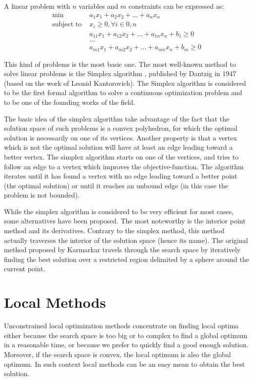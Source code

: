 A linear problem with $n$ variables and $m$ constraints can be expressed as:
\begin{align*}
\text{min } & a_1x_1 + a_2x_2 + ... + a_nx_n\\
\text{subject to } &x_i \geq 0, \forall i \in 0,n\\
&a_{11}x_1 + a_{12}x_2 + ... + a_{1n}x_n + b_1 \geq 0\\
&...\\
&a_{m1}x_1 + a_{m2}x_2 + ... + a_{mn}x_n + b_m \geq 0
\end{align*}

This kind of problems is the most basic one. The most well-known method to solve linear problems is the Simplex algorithm \cite{dantzig1998linear}, published by Dantzig in 1947 (based on the work of Leonid Kantorovich). The Simplex algorithm is considered to be the first formal algorithm to solve a continuous optimization problem and to be one of the founding works of the field.

The basic idea of the simplex algorithm take advantage of the fact that the solution space of such problems is a convex polyhedron, for which the optimal solution is necessarily on one of its vertices. Another property is that a vertex which is not the optimal solution will have at least an edge leading toward a better vertex.
The simplex algorithm starts on one of the vertices, and tries to follow an edge to a vertex which improves the objective-function. The algorithm iterates until it has found a vertex with no edge leading toward a better point (the optimal solution) or until it reaches an unbound edge (in this case the problem is not bounded).

While the simplex algorithm is considered to be very efficient for most cases, some alternatives have been proposed. The most noteworthy is the interior point method and its derivatives. Contrary to the simplex method, this method actually traverses the interior of the solution space (hence its name). The original method proposed by Karmarkar \cite{Karmarkar:1984:NPA:800057.808695} travels through the search space by iteratively finding the best solution over a restricted region delimited by a sphere around the current point.

\section{Local Methods}

Unconstrained local optimization methods concentrate on finding local optima either because the search space is too big or to complex to find a global optimum in a reasonable time, or because we prefer to quickly find a good enough solution.
 Moreover, if the search space is convex, the local optimum is also the global optimum. In such context local methods can be an easy mean to obtain the best solution.

